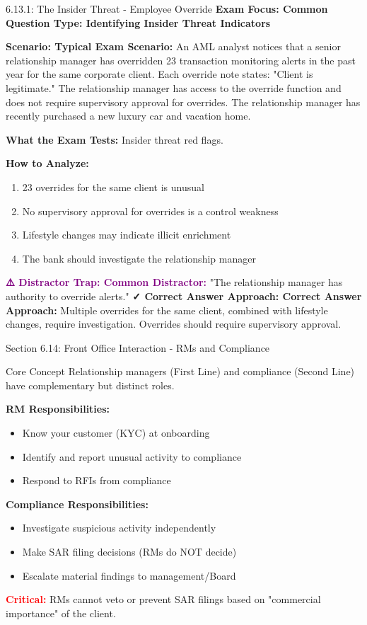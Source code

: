 \documentclass[11pt,a4paper]{beamer}
\newcommand{\redflag}[1]{\textcolor{red}{\textbf{#1}}}
\newcommand{\examfocus}[1]{\textcolor{orange!80!black}{\textbf{Exam Focus: #1}}}
\newcommand{\trap}[1]{\textcolor{purple}{\textbf{⚠️ Distractor Trap: #1}}}
\newcommand{\correct}[1]{\textcolor{green!50!black}{\textbf{✓ Correct Answer Approach: #1}}}
\newcommand{\scenario}[1]{\textcolor{blue!70!black}{\textbf{Scenario: #1}}}
\begin{document}
	\begin{frame}{6.13.1: The Insider Threat - Employee Override}
		\examfocus{Common Question Type: Identifying Insider Threat Indicators}
		
		\scenario{Typical Exam Scenario:}
		An AML analyst notices that a senior relationship manager has overridden 23 transaction monitoring alerts in the past year for the same corporate client. Each override note states: "Client is legitimate." The relationship manager has access to the override function and does not require supervisory approval for overrides. The relationship manager has recently purchased a new luxury car and vacation home.
		
		\textbf{What the Exam Tests:} Insider threat red flags.
		
		\textbf{How to Analyze:}
		\begin{enumerate}
			\item 23 overrides for the same client is unusual
			\item No supervisory approval for overrides is a control weakness
			\item Lifestyle changes may indicate illicit enrichment
			\item The bank should investigate the relationship manager
		\end{enumerate}
		
		\trap{Common Distractor:} "The relationship manager has authority to override alerts."
		\correct{Correct Answer Approach:} Multiple overrides for the same client, combined with lifestyle changes, require investigation. Overrides should require supervisory approval.
	\end{frame}
	
	
	\begin{frame}{Section 6.14: Front Office Interaction - RMs and Compliance}
		\begin{block}{Core Concept}
			Relationship managers (First Line) and compliance (Second Line) have complementary but distinct roles.
		\end{block}
		\textbf{RM Responsibilities:}
		\begin{itemize}
			\item Know your customer (KYC) at onboarding
			\item Identify and report unusual activity to compliance
			\item Respond to RFIs from compliance
		\end{itemize}
		\textbf{Compliance Responsibilities:}
		\begin{itemize}
			\item Investigate suspicious activity independently
			\item Make SAR filing decisions (RMs do NOT decide)
			\item Escalate material findings to management/Board
		\end{itemize}
		\redflag{Critical:} RMs cannot veto or prevent SAR filings based on "commercial importance" of the client.
	\end{frame}
	
\end{document}
